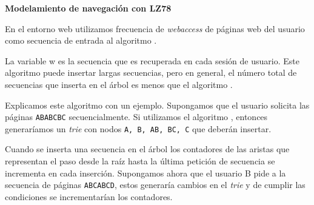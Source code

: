 \textbf{Modelamiento de navegación con LZ78}

En el entorno web utilizamos frecuencia de \emph{webaccess} de páginas web del usuario como secuencia de entrada al algoritmo \lzSieteOcho. 

La variable w es la secuencia que es recuperada en cada sesión de usuario. Este algoritmo puede insertar largas secuencias, pero en general, el número total de secuencias que inserta en el árbol es menos que el algoritmo \PPM. 

Explicamos este algoritmo con un ejemplo. Supongamos que el usuario solicita las páginas \texttt{ABABCBC} secuencialmente. Si utilizamos el algoritmo \lzSieteOcho, entonces generaríamos un \emph{trie} con nodos  \texttt{A, B, AB, BC, C} que deberán insertar. 


Cuando se inserta una secuencia en el árbol los contadores de las aristas que representan el paso desde la raíz hasta la última petición de secuencia se incrementa en cada inserción. Supongamos ahora que el usuario B pide a la secuencia de páginas \texttt{ABCABCD}, estos generaría cambios en el \emph{trie} y de cumplir las condiciones se incrementarían los contadores. 
